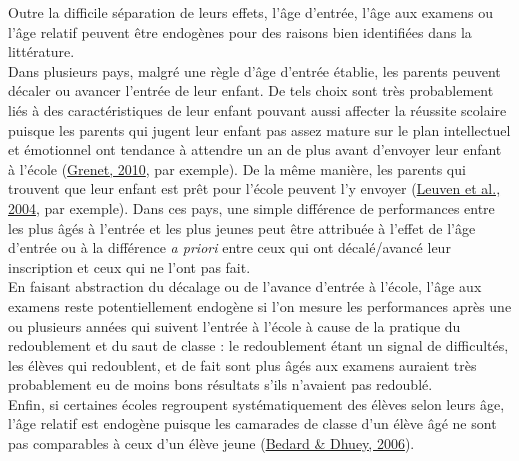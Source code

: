 \documentclass[
]{book}
\begin{document}
\quad Outre la difficile séparation de leurs effets, l'âge d'entrée, l'âge aux examens ou l'âge relatif peuvent être endogènes pour des raisons bien identifiées dans la littérature.\\
Dans plusieurs pays, malgré une règle d'âge d'entrée établie, les parents peuvent décaler ou avancer l'entrée de leur enfant. De tels choix sont très probablement liés à des caractéristiques de leur enfant pouvant aussi affecter la réussite scolaire puisque les parents qui jugent leur enfant pas assez mature sur le plan intellectuel et émotionnel ont tendance à attendre un an de plus avant d'envoyer leur enfant à l'école (\protect\hyperlink{ref-GRE:10}{Grenet, 2010}, par exemple). De la même manière, les parents qui trouvent que leur enfant est prêt pour l'école peuvent l'y envoyer (\protect\hyperlink{ref-LEU:eal:04}{Leuven et al., 2004}, par exemple). Dans ces pays, une simple différence de performances entre les plus âgés à l'entrée et les plus jeunes peut être attribuée à l'effet de l'âge d'entrée ou à la différence \emph{a priori} entre ceux qui ont décalé/avancé leur inscription et ceux qui ne l'ont pas fait.\\
En faisant abstraction du décalage ou de l'avance d'entrée à l'école, l'âge aux examens reste potentiellement endogène si l'on mesure les performances après une ou plusieurs années qui suivent l'entrée à l'école à cause de la pratique du redoublement et du saut de classe : le redoublement étant un signal de difficultés, les élèves qui redoublent, et de fait sont plus âgés aux examens auraient très probablement eu de moins bons résultats s'ils n'avaient pas redoublé.\\
Enfin, si certaines écoles regroupent systématiquement des élèves selon leurs âge, l'âge relatif est endogène puisque les camarades de classe d'un élève âgé ne sont pas comparables à ceux d'un élève jeune (\protect\hyperlink{ref-BED:DHU:06}{Bedard \& Dhuey, 2006}).
\end{document}
